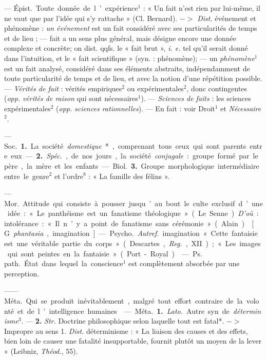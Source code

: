 \begin{itemize}[leftmargin=1cm, label=, itemsep=1pt]
 — \si{Épist.} Toute donnée de l’expérience$^1$ : « Un fait n'est
rien par lui-même, il ne vaut que par l’idée qui s’y rattache » (Cl. Bernard).
$->$ {\it Dist.} événement et phénomène : {\it un événement} est un fait 
considéré avec ses particularités de temps et de lieu ; — fait a un sens
plus général, mais désigne encore une donnée complexe et concrète; on dist. 
qqfs. le « fait brut », {\it i. e.} tel qu'il serait donné dans l'intuition,
et le « fait scientifique » (syn. : phénomène); — un {\it phénomène}$^1$ est
un fait analysé, considéré dans ses éléments abstraits, indépendamment de
toute particularité de temps et de lieu, et avec la notion d’une
répétition possible. — {\it Vérités de fait} : vérités empiriques$^2$ ou
expérimentales$^2$, donc contingentes ({\it opp.}
{\it vérités de raison} qui sont nécessaires$^1$). — {\it Sciences de faits} :
les sciences expérimentales$^2$ ({\it opp.}
{\it sciences rationnelles}). — En fait : voir Droit$^1$ et
{\it Nécessaire}$^2$.

 — \si{Soc.} {\bf 1.} La société {\it domestique}*, comprenant
tous ceux qui sont parents entre eux. — {\bf 2.} {\it Spéc.}, de nos jours,
la société {\it conjugale} : groupe formé par le père, la mère et les enfants.

— \si{Biol.} {\bf 3.} Groupe morphologique intermédiaire entre le genre$^2$
et l’ordre$^8$ : « La famille des félins ».

 — \si{Mor.} Attitude qui consiste à pousser jusqu’au bout le
culte exclusif d’une idée : « Le panthéisme est un fanatisme
théologique » (Le Senne). {\it D'où} : intolérance :
« Il n’y a point de fanatisme sans cérémonie » (Alain).

 [G. {\it phantasia}, imagination].
— \si{Psycho.} {\it Autref.} imagination « Cette fantaisie est une véritable
partie du corps » (Descartes, {\it Reg.}, XII); « Les images qui sont peintes
en la fantaisie » (Port-Royal).

 — \si{Ps. path.} État dans
lequel la conscience$^1$ est complètement absorbée par une perception.

 —— \si{Méta.} Qui se produit inévitablement, malgré tout effort contraire de la volonté et de l’intelligence humaines.

 — \si{Méta.} {\bf 1.} {\it Lato.} Autre.
syn. de {\it déterminisme}$^3$. — {\bf 2.} {\it Str.}
 Doctrine philosophique selon laquelle tout est fatal*.
$->$ Impropre au sens 1. {\it Dist.} déterminisme : « La
liaison des causes et des effets, bien
loin de causer une fatalité insupportable, fournit plutôt un moyen de
la lever » (Leibniz, {\it Théod.}, 55).


\end{itemize}
